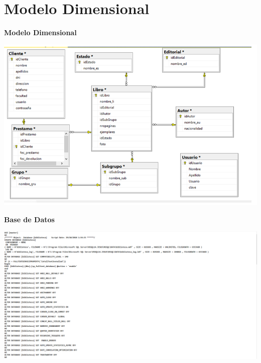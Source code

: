 \section{Modelo Dimensional} 

\textbf{Modelo Dimensional}
\vspace{5mm} %

\vspace{5mm} %
\begin{center}
\includegraphics[width=19cm]{./Imagenes/003}
\end{center}	
\vspace{7mm} %

\textbf{Base de Datos}\\

\vspace{3mm} %
\begin{center}
\includegraphics[width=19cm]{./Imagenes/005}
\end{center}	
\vspace{3mm} %

